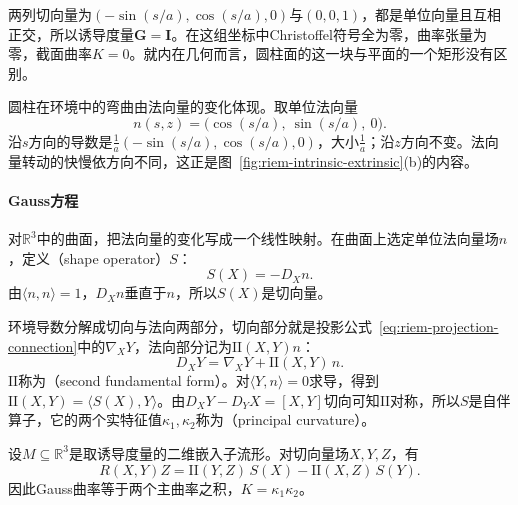 两列切向量为$(-\sin(s/a),\cos(s/a),0)$与$(0,0,1)$，都是单位向量且互相正交，所以诱导度量$\bm G=\bm I$。在这组坐标中Christoffel符号全为零，曲率张量为零，截面曲率$K=0$。就内在几何而言，圆柱面的这一块与平面的一个矩形没有区别。

圆柱在环境中的弯曲由法向量的变化体现。取单位法向量
\[
n(s,z)=\bigl(\cos(s/a),\ \sin(s/a),\ 0\bigr).
\]
沿$s$方向的导数是$\tfrac1a(-\sin(s/a),\cos(s/a),0)$，大小$\tfrac1a$；沿$z$方向不变。法向量转动的快慢依方向不同，这正是图~\ref{fig:riem-intrinsic-extrinsic}(b)的内容。

\paragraph{Gauss方程}
对$\mathbb R^3$中的曲面，把法向量的变化写成一个线性映射。在曲面上选定单位法向量场$n$，定义（shape operator）$S$：
\begin{equation}
S(X)=-D_Xn .
\label{eq:riem-shape-operator}
\end{equation}
由$\langle n,n\rangle=1$，$D_Xn$垂直于$n$，所以$S(X)$是切向量。

环境导数分解成切向与法向两部分，切向部分就是投影公式~\eqref{eq:riem-projection-connection}中的$\nabla_XY$，法向部分记为$\mathrm{II}(X,Y)n$：
\begin{equation}
D_XY=\nabla_XY+\mathrm{II}(X,Y)\,n .
\label{eq:riem-gauss-formula}
\end{equation}
$\mathrm{II}$称为（second fundamental form）。对$\langle Y,n\rangle=0$求导，得到$\mathrm{II}(X,Y)=\langle S(X),Y\rangle$。由$D_XY-D_YX=[X,Y]$切向可知$\mathrm{II}$对称，所以$S$是自伴算子，它的两个实特征值$\kappa_1,\kappa_2$称为（principal curvature）。

\begin{theorem}[Gauss方程]
\label{thm:riem-gauss-equation}
设$M\subseteq\mathbb R^3$是取诱导度量的二维嵌入子流形。对切向量场$X,Y,Z$，有
\begin{equation}
R(X,Y)Z=\mathrm{II}(Y,Z)\,S(X)-\mathrm{II}(X,Z)\,S(Y).
\label{eq:riem-gauss-equation}
\end{equation}
因此Gauss曲率等于两个主曲率之积，$K=\kappa_1\kappa_2$。
\end{theorem}

